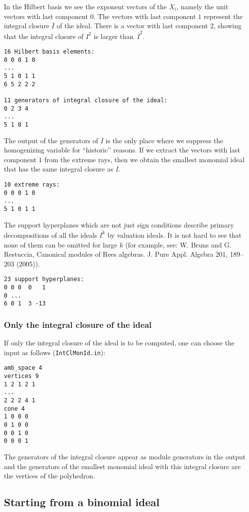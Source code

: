 \documentclass[12pt,a4paper]{scrartcl}
\theoremstyle{definition}
\begin{document}
In the Hilbert basis we see the exponent vectors of the $X_i$, namely the unit vectors with last component $0$. The vectors with last component $1$ represent the integral closure $\overline I$  of the ideal. There is a  vector with last component $2$, showing that the integral closure of $I^2$ is larger than~$\overline I^2$.
\begin{Verbatim}
16 Hilbert basis elements:
0 0 0 1 0
...
5 1 0 1 1
6 5 2 2 2

11 generators of integral closure of the ideal:
0 2 3 4
...
5 1 0 1
\end{Verbatim}
The output of the generators of $\overline I$ is the only place where we suppress the homogenizing variable for ``historic'' reasons. If we extract the vectors with last component $1$ from the extreme rays, then we obtain the smallest monomial ideal that has the same integral closure as $I$.
\begin{Verbatim}
10 extreme rays:
0 0 0 1 0
...
5 1 0 1 1
\end{Verbatim}
The support hyperplanes which are not just sign conditions describe primary decompositions of all the ideals $\overline{I^k}$ by valuation ideals. It is not hard to see that none of them can be omitted for large $k$ (for example, see: W. Bruns and G. Restuccia,  Canonical modules of Rees algebras. J. Pure Appl. Algebra 201, 189--203 (2005)).
\begin{Verbatim}
23 support hyperplanes:
0 0 0  0   1
0 ...
6 0 1  3 -13
\end{Verbatim}

\subsubsection{Only the integral closure of the ideal}

If only the integral closure of the ideal is to be computed, one can choose the input as follows (\verb|IntClMonId.in|):
\begin{Verbatim}
amb_space 4
vertices 9
1 2 1 2 1
...
2 2 2 4 1
cone 4
1 0 0 0
0 1 0 0
0 0 1 0
0 0 0 1
\end{Verbatim}

The generators of the integral closure appear as module generators in the output and the generators of the smallest monomial ideal with this integral closure are the vertices of the polyhedron.

\subsection{Starting from a binomial ideal}\label{binom_ex}
\end{document}
